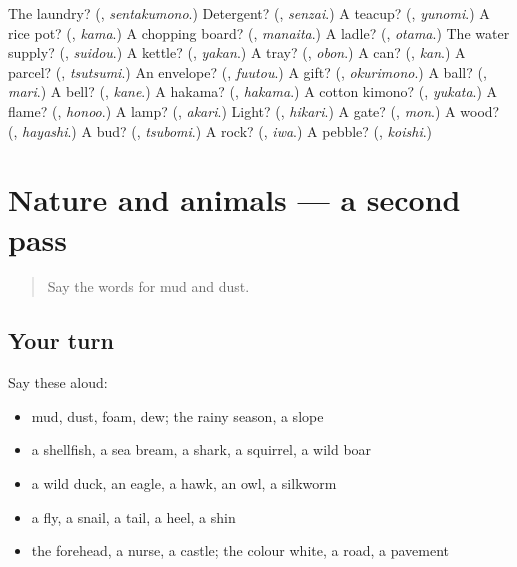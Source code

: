 \begin{tcolorbox}[breakable,colback=teal!4,colframe=teal!35!black,title={Before you move on}]
The laundry? (\textbf{}, \emph{sentakumono}.) Detergent? (\textbf{}, \emph{senzai}.) A teacup? (\textbf{}, \emph{yunomi}.) A rice pot? (\textbf{}, \emph{kama}.) A chopping board? (\textbf{}, \emph{manaita}.) A ladle? (\textbf{}, \emph{otama}.) The water supply? (\textbf{}, \emph{suidou}.) A kettle? (\textbf{}, \emph{yakan}.) A tray? (\textbf{}, \emph{obon}.) A can? (\textbf{}, \emph{kan}.) A parcel? (\textbf{}, \emph{tsutsumi}.) An envelope? (\textbf{}, \emph{fuutou}.) A gift? (\textbf{}, \emph{okurimono}.) A ball? (\textbf{}, \emph{mari}.) A bell? (\textbf{}, \emph{kane}.) A hakama? (\textbf{}, \emph{hakama}.) A cotton kimono? (\textbf{}, \emph{yukata}.) A flame? (\textbf{}, \emph{honoo}.) A lamp? (\textbf{}, \emph{akari}.) Light? (\textbf{}, \emph{hikari}.) A gate? (\textbf{}, \emph{mon}.) A wood? (\textbf{}, \emph{hayashi}.) A bud? (\textbf{}, \emph{tsubomi}.) A rock? (\textbf{}, \emph{iwa}.) A pebble? (\textbf{}, \emph{koishi}.)
\end{tcolorbox}
\section[(dialogue)]{Nature and animals — a second pass}

\label{lesson:JA-R111-second-pass-nature-and-animals}



\begin{quote}
Say the words for mud and dust.
\end{quote}

\subsection*{Your turn}
Say these aloud:

\begin{itemize}
\raggedright
  \item mud, dust, foam, dew; the rainy season, a slope
  \item a shellfish, a sea bream, a shark, a squirrel, a wild boar
  \item a wild duck, an eagle, a hawk, an owl, a silkworm
  \item a fly, a snail, a tail, a heel, a shin
  \item the forehead, a nurse, a castle; the colour white, a road, a pavement
\end{itemize}

